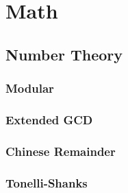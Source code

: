 \documentclass[10pt, twocolumn, oneside]{article}
\begin{document}
\fontsize{7.5pt}{10pt}\selectfont

\tableofcontents

\section{Math}
    \subsection{Number Theory}
        \subsubsection{Modular}
            
        \subsubsection{Extended GCD}
            
        \subsubsection{Chinese Remainder}
            
        \subsubsection{Tonelli-Shanks}
            

%         
\end{document}
